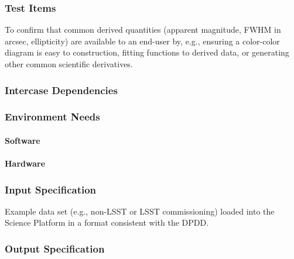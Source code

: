 \subsubsection{Test Items}
To confirm that common derived quantities (apparent magnitude, FWHM in
arcsec, ellipticity) are available to an end-user by, e.g., ensuring a
color-color diagram is easy to construction, fitting functions to
derived data, or generating other common scientific derivatives.



\subsubsection{Intercase Dependencies}

\subsubsection{Environment Needs}

\paragraph{Software}

\paragraph{Hardware}

\subsubsection{Input Specification}
Example data set (e.g., non-LSST or LSST commissioning) loaded into the
Science Platform in a format consistent with the DPDD.


\subsubsection{Output Specification}

